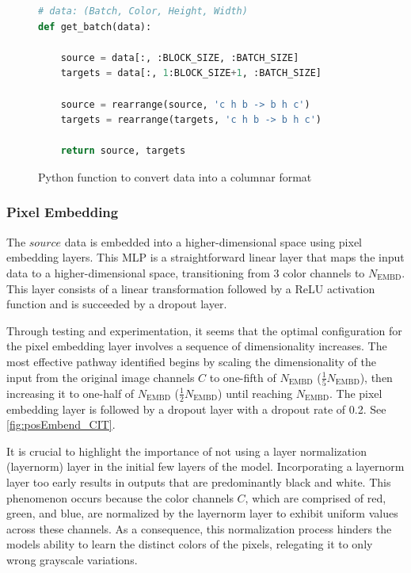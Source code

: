 \begin{figure}[H]
\centering
\begin{lstlisting}[language=Python]
# data: (Batch, Color, Height, Width)
def get_batch(data):

    source = data[:, :BLOCK_SIZE, :BATCH_SIZE]
    targets = data[:, 1:BLOCK_SIZE+1, :BATCH_SIZE]

    source = rearrange(source, 'c h b -> b h c')
    targets = rearrange(targets, 'c h b -> b h c')

    return source, targets
\end{lstlisting}
\caption{Python function to convert data into a columnar format}
\label{fig:get_batch_CIT}
\end{figure}

    \subsubsection{Pixel Embedding}

    The \(source\) data is embedded into a higher-dimensional space using pixel embedding layers. This MLP is a straightforward linear layer that maps the input data to a higher-dimensional space, transitioning from \(3\) color channels to \(N_{\text{EMBD}}\). This layer consists of a linear transformation followed by a ReLU activation function and is succeeded by a dropout layer.

    Through testing and experimentation, it seems that the optimal configuration for the pixel embedding layer involves a sequence of dimensionality increases. The most effective pathway identified begins by scaling the dimensionality of the input from the original image channels \(C\) to one-fifth of \(N_{\text{EMBD}}\) (\(\frac{1}{5}N_{\text{EMBD}}\)), then increasing it to one-half of \(N_{\text{EMBD}}\) (\(\frac{1}{2}N_{\text{EMBD}}\)) until reaching \(N_{\text{EMBD}}\). The pixel embedding layer is followed by a dropout layer with a dropout rate of 0.2. See \autoref{fig:posEmbend_CIT}.

    It is crucial to highlight the importance of not using a layer normalization (layernorm) layer in the initial few layers of the model. Incorporating a layernorm layer too early results in outputs that are predominantly black and white. This phenomenon occurs because the color channels \(C\), which are comprised of red, green, and blue, are normalized by the layernorm layer to exhibit uniform values across these channels. As a consequence, this normalization process hinders the models ability to learn the distinct colors of the pixels, relegating it to only wrong grayscale variations.

